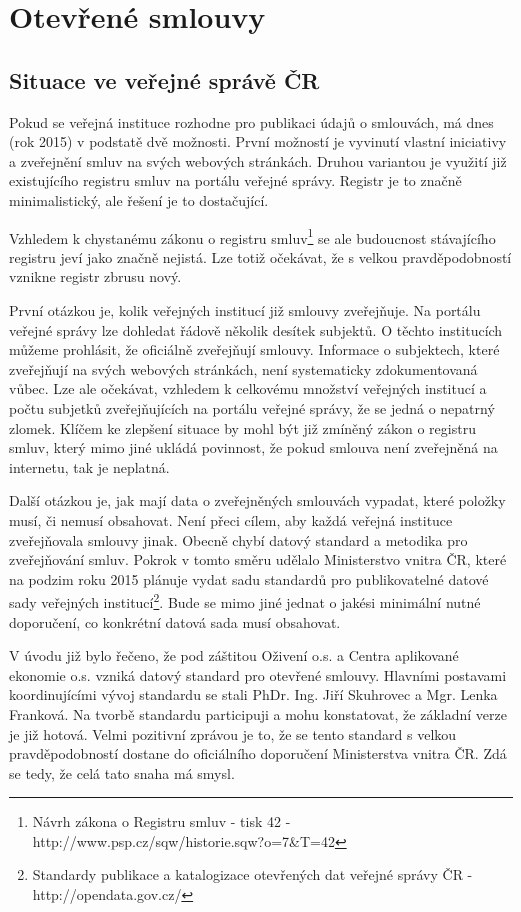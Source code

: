 \chapter{Otevřené smlouvy}
\label{sec:kap3}

\section{Situace ve veřejné správě ČR}

Pokud se veřejná instituce rozhodne pro publikaci údajů o smlouvách, má dnes (rok 2015) v podstatě dvě možnosti. První možností je vyvinutí vlastní iniciativy a zveřejnění smluv na svých webových stránkách. Druhou variantou je využití již existujícího registru smluv na portálu veřejné správy\cite{gov}. Registr je to značně minimalistický, ale řešení je to dostačující.

Vzhledem k chystanému zákonu o registru smluv\footnote{Návrh zákona o Registru smluv - tisk 42 - http://www.psp.cz/sqw/historie.sqw?o=7\&T=42} se ale budoucnost stávajícího registru jeví jako značně nejistá. Lze totiž očekávat, že s velkou pravděpodobností vznikne registr zbrusu nový.

První otázkou je, kolik veřejných institucí již smlouvy zveřejňuje. Na portálu veřejné správy lze dohledat řádově několik desítek subjektů. O těchto institucích můžeme prohlásit, že oficiálně zveřejňují smlouvy. Informace o subjektech, které zveřejňují na svých webových stránkách, není systematicky zdokumentovaná vůbec. Lze ale očekávat, vzhledem k celkovému množství veřejných institucí a počtu subjetků zveřejňujících na portálu veřejné správy, že se jedná o nepatrný zlomek. Klíčem ke zlepšení situace by mohl být již zmíněný zákon o registru smluv, který mimo jiné ukládá povinnost, že pokud smlouva není zveřejněná na internetu, tak je neplatná.

Další otázkou je, jak mají data o zveřejněných smlouvách vypadat, které položky musí, či nemusí obsahovat. Není přeci cílem, aby každá veřejná instituce zveřejňovala smlouvy jinak. Obecně chybí datový standard a metodika pro zveřejňování smluv. Pokrok v tomto směru udělalo Ministerstvo vnitra ČR, které na podzim roku 2015 plánuje vydat sadu standardů pro publikovatelné datové sady veřejných institucí\footnote{Standardy publikace a katalogizace otevřených dat veřejné správy ČR - http://opendata.gov.cz/}. Bude se mimo jiné jednat o jakési minimální nutné doporučení, co konkrétní datová sada musí obsahovat.

V úvodu již bylo řečeno, že pod záštitou Oživení o.s. a Centra aplikované ekonomie o.s. vzniká datový standard pro otevřené smlouvy. Hlavními postavami koordinujícími vývoj standardu se stali PhDr. Ing. Jiří Skuhrovec a Mgr. Lenka Franková. Na tvorbě standardu participuji a mohu konstatovat, že základní verze je již hotová. Velmi pozitivní zprávou je to, že se tento standard s velkou pravděpodobností dostane do oficiálního doporučení Ministerstva vnitra ČR. Zdá se tedy, že celá tato snaha má smysl.

